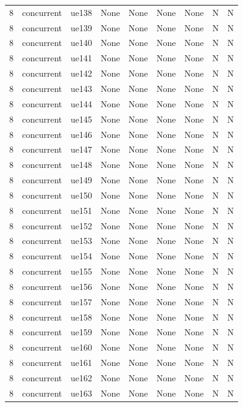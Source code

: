 \begin{table}[ht]
\begin{tabular}{|c|c|c|c|c|c|c|c|c|}
8 & concurrent & ue138 & None & None & None & None & N & N \\
8 & concurrent & ue139 & None & None & None & None & N & N \\
8 & concurrent & ue140 & None & None & None & None & N & N \\
8 & concurrent & ue141 & None & None & None & None & N & N \\
8 & concurrent & ue142 & None & None & None & None & N & N \\
8 & concurrent & ue143 & None & None & None & None & N & N \\
8 & concurrent & ue144 & None & None & None & None & N & N \\
8 & concurrent & ue145 & None & None & None & None & N & N \\
8 & concurrent & ue146 & None & None & None & None & N & N \\
8 & concurrent & ue147 & None & None & None & None & N & N \\
8 & concurrent & ue148 & None & None & None & None & N & N \\
8 & concurrent & ue149 & None & None & None & None & N & N \\
8 & concurrent & ue150 & None & None & None & None & N & N \\
8 & concurrent & ue151 & None & None & None & None & N & N \\
8 & concurrent & ue152 & None & None & None & None & N & N \\
8 & concurrent & ue153 & None & None & None & None & N & N \\
8 & concurrent & ue154 & None & None & None & None & N & N \\
8 & concurrent & ue155 & None & None & None & None & N & N \\
8 & concurrent & ue156 & None & None & None & None & N & N \\
8 & concurrent & ue157 & None & None & None & None & N & N \\
8 & concurrent & ue158 & None & None & None & None & N & N \\
8 & concurrent & ue159 & None & None & None & None & N & N \\
8 & concurrent & ue160 & None & None & None & None & N & N \\
8 & concurrent & ue161 & None & None & None & None & N & N \\
8 & concurrent & ue162 & None & None & None & None & N & N \\
8 & concurrent & ue163 & None & None & None & None & N & N \\

\end{tabular}
\end{table}
